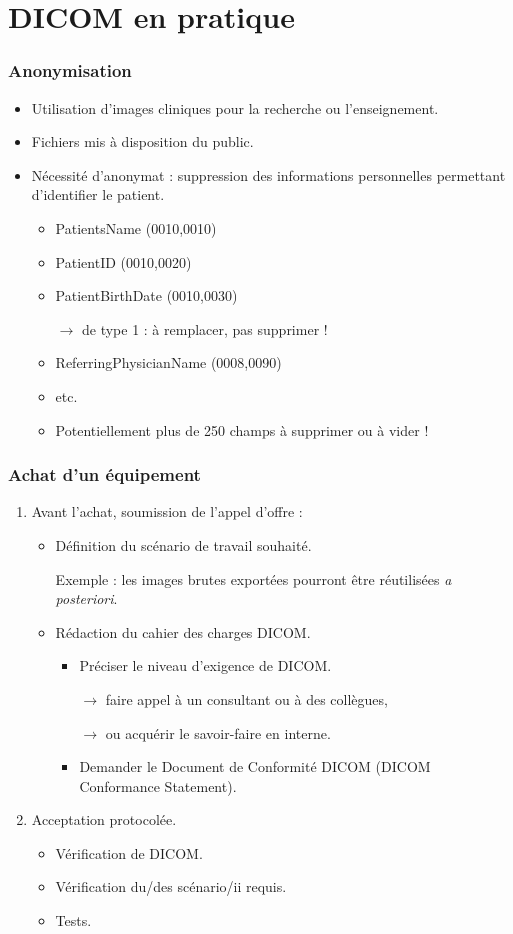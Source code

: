 \section{DICOM en pratique}

\frame
{
	\frametitle{Anonymisation}
	\begin{itemize}
		\item<1-> Utilisation d'images cliniques pour la recherche ou l'enseignement.
		\item<2-> Fichiers mis \`a disposition du public.
		\item<3-> N\'ecessit\'e d'anonymat : suppression des informations personnelles permettant d'identifier le patient.
		\begin{itemize}
			\item<4-> PatientsName (0010,0010)
			\item<5-> PatientID (0010,0020)
			\item<6-> PatientBirthDate (0010,0030)
			
			$\rightarrow$ de type 1 : \`a remplacer, pas supprimer !
			\item<7-> ReferringPhysicianName (0008,0090)
			\item<8-> etc.
			\item<9-> Potentiellement plus de 250 champs \`a supprimer ou \`a vider !
		\end{itemize}
	\end{itemize}
}

\frame
{
	\frametitle{Achat d'un \'equipement}
	\begin{enumerate}
		\item<1-> Avant l'achat, soumission de l'appel d'offre :
		\begin{itemize}
			\item<2-> D\'efinition du sc\'enario de travail souhait\'e.

                Exemple : les images brutes export\'ees pourront \^etre r\'eutilis\'ees \emph{a posteriori}.
			\item<3-> R\'edaction du cahier des charges DICOM.
			\begin{itemize}
				\item<4-> Pr\'eciser le niveau d'exigence de DICOM.
				
				$\rightarrow$ faire appel \`a un consultant ou \`a des coll\`egues,
				
				$\rightarrow$ ou acqu\'erir le savoir-faire en interne.
				\item<5-> Demander le Document de Conformit\'e DICOM (DICOM Conformance Statement).
			\end{itemize}
		\end{itemize}
		\item<6-> Acceptation protocol\'ee.
		\begin{itemize}
			\item<7-> V\'erification de DICOM.
			\item<8-> V\'erification du/des sc\'enario/ii requis.
			\item<9-> Tests.
		\end{itemize}
	\end{enumerate}
}

